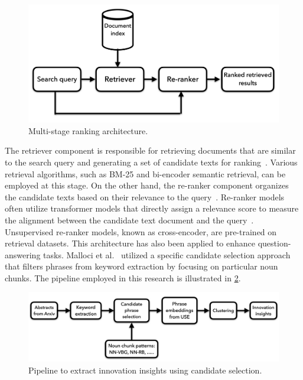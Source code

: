 \begin{figure}[h]
	\centering
	\includegraphics[width=.95\textwidth]{images/thesis_images/retriever_reranker_approach.png}
	\caption{Multi-stage ranking architecture.  \label{fig:multi-stage-ranking}}
\end{figure}

The retriever component is responsible for retrieving documents that are similar to the search query and generating a set of candidate texts for ranking~\cite{yates2021pretrained}. Various retrieval algorithms, such as BM-25 and bi-encoder semantic retrieval, can be employed at this stage. On the other hand, the re-ranker component organizes the candidate texts based on their relevance to the query~\cite{yates2021pretrained}. Re-ranker models often utilize transformer models that directly assign a relevance score to measure the alignment between the candidate text document and the query~\cite{nogueira2019passage, yates2021pretrained}. Unsupervised re-ranker models, known as cross-encoder, are pre-trained on retrieval datasets. This architecture has also been applied to enhance question-answering tasks. Malloci et al.~\cite{malloci2020text} utilized a specific candidate selection approach that filters phrases from keyword extraction by focusing on particular noun chunks. The pipeline employed in this research is illustrated in  \ref{fig:syntactic_candiate_selection}. 

\begin{figure}[h]
	\centering
	\includegraphics[width=.99\textwidth]{images/thesis_images/syntactic_candidate_selection.png}
	\caption[Innovation insights pipeline extraction.]{Pipeline to extract innovation insights using candidate selection.   \label{fig:syntactic_candiate_selection}}
\end{figure}

